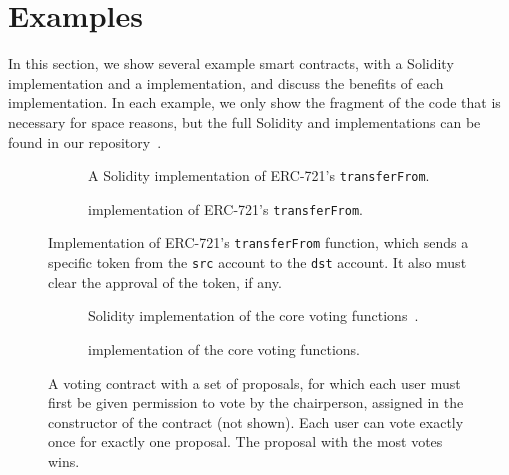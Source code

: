 \documentclass[dvipsnames, usenames, sigconf]{acmart}
\begin{document}
\section{Examples}
In this section, we show several example smart contracts, with a Solidity implementation and a \langName implementation, and discuss the benefits of each implementation.
In each example, we only show the fragment of the code that is necessary for space reasons, but the full Solidity and \langName implementations can be found in our repository~\cite{psamatheRepo}.
\begin{figure*}
    \centering
    \begin{subfigure}[t]{0.49\textwidth}
        \centering
        
        \caption{A Solidity implementation of ERC-721's \lstinline{transferFrom}.}
        \label{fig:erc721-impl-sol}
    \end{subfigure}%
    \hfill
    \begin{subfigure}[t]{0.49\textwidth}
        \centering
        
        \caption{\langName implementation of ERC-721's \lstinline{transferFrom}.}
        \label{fig:erc721-impl-flow}
    \end{subfigure}
    \caption{Implementation of ERC-721's \lstinline{transferFrom} function, which sends a specific token from the \lstinline{src} account to the \lstinline{dst} account.
        It also must clear the approval of the token, if any.}
    \label{fig:erc721-impl}
\end{figure*}
\begin{figure*}[ht]
    \centering
    \begin{subfigure}[t]{0.49\textwidth}
        \centering
        
        \caption{Solidity implementation of the core voting functions~\cite{solidityByExample}.}
        \label{fig:voting-impl-sol}
    \end{subfigure}%
    \hfill
    \begin{subfigure}[t]{0.49\textwidth}
        \centering
        
        \caption{\langName implementation of the core voting functions.}
        \label{fig:voting-impl-flow}
    \end{subfigure}
    \caption{A voting contract with a set of proposals, for which each user must first be given permission to vote by the chairperson, assigned in the constructor of the contract (not shown).
    Each user can vote exactly once for exactly one proposal.
    The proposal with the most votes wins.}
    \label{fig:voting-impl}
\end{figure*}
\end{document}
